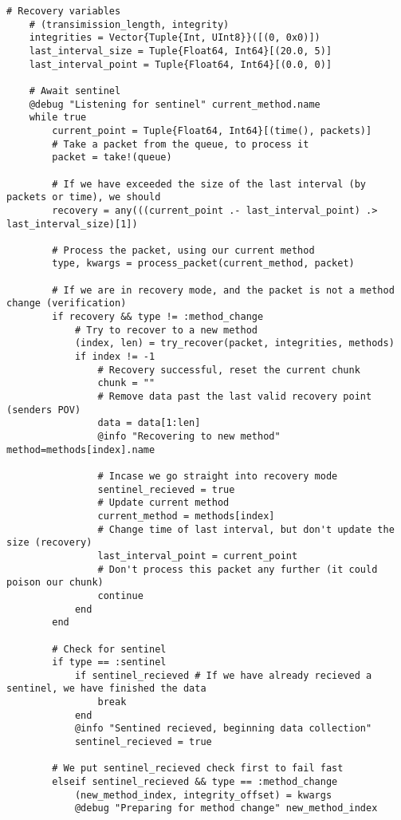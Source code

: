 \begin{lstlisting}[language=JuliaLocal, style=julia]
    # Recovery variables
    # (transimission_length, integrity)
    integrities = Vector{Tuple{Int, UInt8}}([(0, 0x0)])
    last_interval_size = Tuple{Float64, Int64}[(20.0, 5)]
    last_interval_point = Tuple{Float64, Int64}[(0.0, 0)]

    # Await sentinel
    @debug "Listening for sentinel" current_method.name
    while true
        current_point = Tuple{Float64, Int64}[(time(), packets)]
        # Take a packet from the queue, to process it
        packet = take!(queue)
        
        # If we have exceeded the size of the last interval (by packets or time), we should 
        recovery = any(((current_point .- last_interval_point) .> last_interval_size)[1])
        
        # Process the packet, using our current method
        type, kwargs = process_packet(current_method, packet)

        # If we are in recovery mode, and the packet is not a method change (verification)
        if recovery && type != :method_change
            # Try to recover to a new method
            (index, len) = try_recover(packet, integrities, methods)
            if index != -1
                # Recovery successful, reset the current chunk
                chunk = ""
                # Remove data past the last valid recovery point (senders POV)
                data = data[1:len]
                @info "Recovering to new method" method=methods[index].name
                
                # Incase we go straight into recovery mode
                sentinel_recieved = true
                # Update current method
                current_method = methods[index]
                # Change time of last interval, but don't update the size (recovery)
                last_interval_point = current_point
                # Don't process this packet any further (it could poison our chunk)
                continue
            end
        end

        # Check for sentinel
        if type == :sentinel
            if sentinel_recieved # If we have already recieved a sentinel, we have finished the data
                break
            end
            @info "Sentined recieved, beginning data collection"
            sentinel_recieved = true

        # We put sentinel_recieved check first to fail fast
        elseif sentinel_recieved && type == :method_change
            (new_method_index, integrity_offset) = kwargs
            @debug "Preparing for method change" new_method_index
            

\end{lstlisting}

